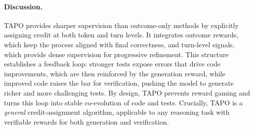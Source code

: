 \documentclass{article} %
\begin{document}
\paragraph{Discussion.}
TAPO provides sharper supervision than outcome-only methods by explicitly assigning credit at both token and turn levels. It integrates outcome rewards, which keep the process aligned with final correctness, and turn-level signals, which provide dense supervision for progressive refinement. This structure establishes a feedback loop: stronger tests expose errors that drive code improvements, which are then reinforced by the generation reward, while improved code raises the bar for verification, pushing the model to generate richer and more challenging tests. By design, TAPO prevents reward gaming and turns this loop into stable co-evolution of code and tests. Crucially, TAPO is a \emph{general} credit-assignment algorithm, applicable to any reasoning task with verifiable rewards for both generation and verification.



\end{document}
